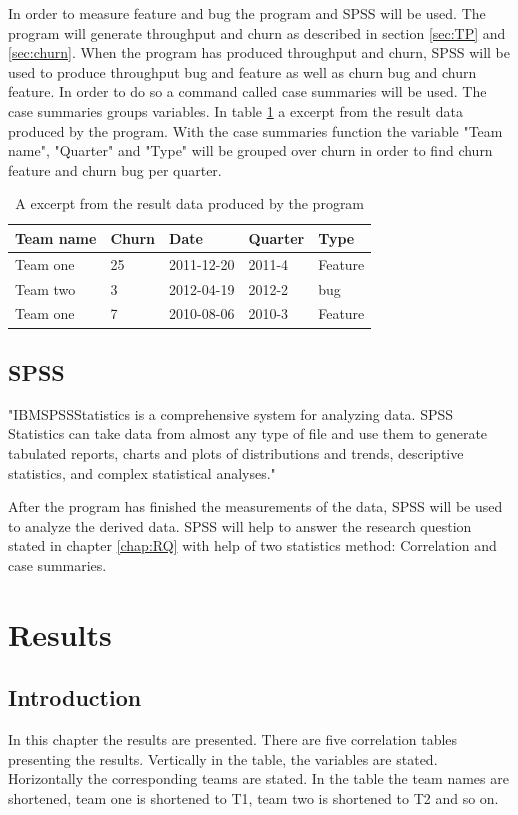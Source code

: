 \documentclass[UKenglish]{ifimaster}  %
\begin{document}
In order to measure feature and bug the program and SPSS will be used. The program will generate throughput and churn as described in section \ref{sec:TP} and \ref{sec:churn}. When the program has produced throughput and churn, SPSS will be used to produce throughput bug and feature as well as churn bug and churn feature. In order to do so a command called case summaries will be used. The case summaries groups variables. In table \ref{tab:ftb} a excerpt from the result data produced by the program.  With the case summaries function the variable "Team name", "Quarter" and "Type" will be grouped over churn in order to find churn feature and churn bug per quarter. 


\begin{table}[!ht]
\center
\begin{tabular}{ | l | l | l | l | l | }
\hline
	Team name & Churn & Date & Quarter & Type \\ \hline
	Team one & 25 &2011-12-20& 2011-4 & Feature \\ \hline
	Team two & 3 &2012-04-19 & 2012-2 & bug \\ \hline
	Team one & 7 & 2010-08-06 & 2010-3 & Feature \\ \hline
\end{tabular}
\caption{A excerpt from the result data produced by the program }
\label{tab:ftb} 
\end{table}

\section{SPSS}
\label{sec:SPSS}
"IBM\circledR  SPSS\circledR Statistics is a comprehensive system for analyzing data. SPSS Statistics can take data from almost any type of file and use them to generate tabulated reports, charts and plots of distributions and trends, descriptive statistics, and complex statistical analyses." \parencite{IBM}

After the program has finished the measurements of the data, SPSS will be used to analyze the derived data. SPSS will help to answer the research question stated in chapter \ref{chap:RQ} with help of two statistics method: Correlation and case summaries. 


\chapter{Results}                     %
\label{ch:res}
\section{Introduction}
In this chapter the results are presented. There are five correlation tables presenting the results. Vertically in the table, the variables are stated. Horizontally the corresponding teams are stated. In the table the team names are shortened, team one is shortened to T1, team two is shortened to T2 and so on. 
\end{document}
